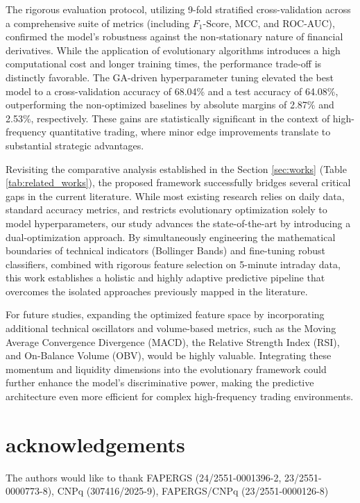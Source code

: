 \documentclass{ieeeaccess}
\begin{document}
The rigorous evaluation protocol, utilizing 9-fold stratified cross-validation across a comprehensive suite of metrics (including $F_1\text{-Score}$, MCC, and ROC-AUC), confirmed the model's robustness against the non-stationary nature of financial derivatives. While the application of evolutionary algorithms introduces a high computational cost and longer training times, the performance trade-off is distinctly favorable. The GA-driven hyperparameter tuning elevated the best model to a cross-validation accuracy of 68.04\% and a test accuracy of 64.08\%, outperforming the non-optimized baselines by absolute margins of 2.87\% and 2.53\%, respectively. These gains are statistically significant in the context of high-frequency quantitative trading, where minor edge improvements translate to substantial strategic advantages.

Revisiting the comparative analysis established in the Section \ref{sec:works} (Table \ref{tab:related_works}), the proposed framework successfully bridges several critical gaps in the current literature. While most existing research relies on daily data, standard accuracy metrics, and restricts evolutionary optimization solely to model hyperparameters, our study advances the state-of-the-art by introducing a dual-optimization approach. By simultaneously engineering the mathematical boundaries of technical indicators (Bollinger Bands) and fine-tuning robust classifiers, combined with rigorous feature selection on 5-minute intraday data, this work establishes a holistic and highly adaptive predictive pipeline that overcomes the isolated approaches previously mapped in the literature.

For future studies, expanding the optimized feature space by incorporating additional technical oscillators and volume-based metrics, such as the Moving Average Convergence Divergence (MACD), the Relative Strength Index (RSI), and On-Balance Volume (OBV), would be highly valuable. Integrating these momentum and liquidity dimensions into the evolutionary framework could further enhance the model's discriminative power, making the predictive architecture even more efficient for complex high-frequency trading environments.

\section{acknowledgements}

The authors would like to thank FAPERGS (24/2551-0001396-2, 23/2551-0000773-8), CNPq (307416/2025-9), FAPERGS/CNPq (23/2551-0000126-8)




\EOD
\end{document}
